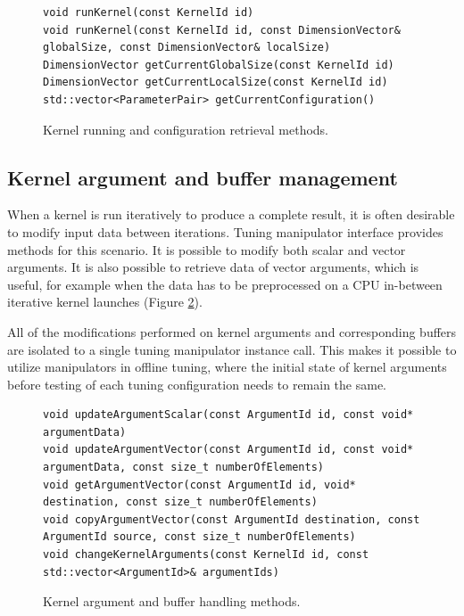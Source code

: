 \documentclass
[
    digital, %
    oneside, %
    table, %
    nolof, %
    nolot, %
    nocover %
]{fithesis3}
\begin{document}
\begin{figure}
\begin{adjustwidth}{-1cm}{-1cm}
\begin{lstlisting}
void runKernel(const KernelId id)
void runKernel(const KernelId id, const DimensionVector& globalSize, const DimensionVector& localSize)
DimensionVector getCurrentGlobalSize(const KernelId id)
DimensionVector getCurrentLocalSize(const KernelId id)
std::vector<ParameterPair> getCurrentConfiguration()
\end{lstlisting}
\caption{Kernel running and configuration retrieval methods.}
\label{ktt-manipulator-kernel-methods}
\end{adjustwidth}
\end{figure}

\subsection{Kernel argument and buffer management}
When a kernel is run iteratively to produce a complete result, it is often desirable to modify input data between iterations. Tuning manipulator
interface provides methods for this scenario. It is possible to modify both scalar and vector arguments. It is also possible to retrieve data of
vector arguments, which is useful, for example when the data has to be preprocessed on a CPU in-between iterative kernel launches (Figure
\ref{ktt-manipulator-buffer-methods}).

All of the modifications performed on kernel arguments and corresponding buffers are isolated to a single tuning manipulator instance call. This makes
it possible to utilize manipulators in offline tuning, where the initial state of kernel arguments before testing of each tuning configuration needs to
remain the same.

\begin{figure}[ht]
\begin{adjustwidth}{-1cm}{-1cm}
\begin{lstlisting}
void updateArgumentScalar(const ArgumentId id, const void* argumentData)
void updateArgumentVector(const ArgumentId id, const void* argumentData, const size_t numberOfElements)
void getArgumentVector(const ArgumentId id, void* destination, const size_t numberOfElements)
void copyArgumentVector(const ArgumentId destination, const ArgumentId source, const size_t numberOfElements)
void changeKernelArguments(const KernelId id, const std::vector<ArgumentId>& argumentIds)
\end{lstlisting}
\caption{Kernel argument and buffer handling methods.}
\label{ktt-manipulator-buffer-methods}
\end{adjustwidth}
\end{figure}
\end{document}

